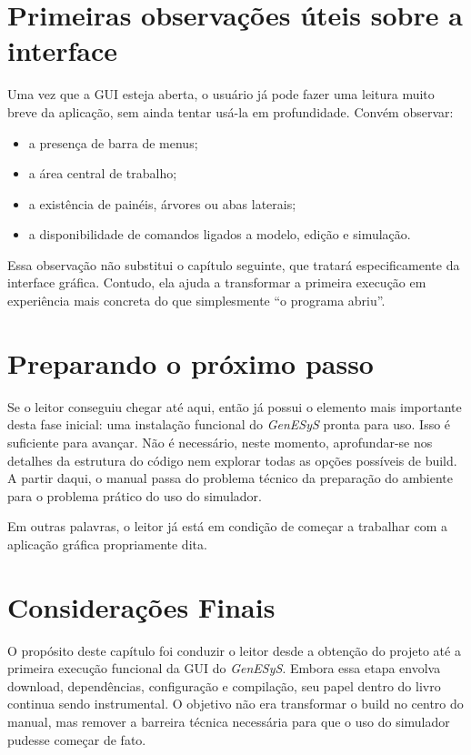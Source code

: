 \section{Primeiras observações úteis sobre a interface}
\label{sec:cap2_primeiras_observacoes_interface}

Uma vez que a GUI esteja aberta, o usuário já pode fazer uma leitura muito breve da aplicação, sem ainda tentar usá-la em profundidade. Convém observar:
\begin{itemize}
    \item a presença de barra de menus;
    \item a área central de trabalho;
    \item a existência de painéis, árvores ou abas laterais;
    \item a disponibilidade de comandos ligados a modelo, edição e simulação.
\end{itemize}

Essa observação não substitui o capítulo seguinte, que tratará especificamente da interface gráfica. Contudo, ela ajuda a transformar a primeira execução em experiência mais concreta do que simplesmente ``o programa abriu''.

\section{Preparando o próximo passo}
\label{sec:cap2_preparando_proximo_passo}

Se o leitor conseguiu chegar até aqui, então já possui o elemento mais importante desta fase inicial: uma instalação funcional do \textit{GenESyS} pronta para uso. Isso é suficiente para avançar. Não é necessário, neste momento, aprofundar-se nos detalhes da estrutura do código nem explorar todas as opções possíveis de build. A partir daqui, o manual passa do problema técnico da preparação do ambiente para o problema prático do uso do simulador.

Em outras palavras, o leitor já está em condição de começar a trabalhar com a aplicação gráfica propriamente dita.

\section{Considerações Finais}
\label{sec:cap2_consideracoes_finais}

O propósito deste capítulo foi conduzir o leitor desde a obtenção do projeto até a primeira execução funcional da GUI do \textit{GenESyS}. Embora essa etapa envolva download, dependências, configuração e compilação, seu papel dentro do livro continua sendo instrumental. O objetivo não era transformar o build no centro do manual, mas remover a barreira técnica necessária para que o uso do simulador pudesse começar de fato.

